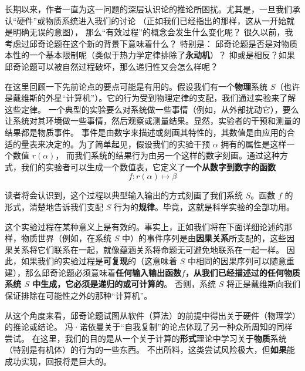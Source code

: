 \documentclass[a4paper,12pt]{article}
\begin{document}
长期以来，作者一直为这一问题的深层认识论的推论所困扰\cite{RosenR1962}。尤其是，一旦我们承认“\gls{硬件}”或\gls{物质系统}进入我们的讨论
（正如我们已经指出的那样，这从一开始就是明确无误的意图）， 那么“\gls{有效过程}”的概念会发生什么变化呢？
很久以前\cite{RosenR1962}，我考虑过\gls{邱奇论题}在这个新的背景下意味着什么？ 特别是：
邱奇论题是否是对\gls{物质}本性的一个基本限制呢（类似于热力学定律排除了\textbf{永动机}）？
抑或是相反？如果邱奇论题可以被自然过程破坏，那么递归性又会怎么样呢？

在这里回顾一下先前论点的要点可能是有用的。假设我们有一个\textbf{物理}系统 $S$（也许是戴维斯的外星“计算机”）。它的行为受到物理定律的支配，我们通过实验来了解这些定律。
一个典型的实验要么对系统做一些事情（例如，从外部扰动它），要么让系统对其环境做一些事情，然后\gls{观察}或\gls{测量}结果。显然，实验者的\gls{干预}和\gls{测量}的结果都是\gls{物质事件}。
\gls{事件}是由数字来描述或刻画其特性的，其数值是由应用的合适的量表来决定的\cite{RosenR1978}。为了简单起见，假设我们的实验干预 $\alpha$ 拥有的属性是这样一个数值 $r(\alpha)$，
而我们系统的结果行为由另一个这样的数字刻画。通过这种方式，我们的实验者可以生成一个数值表，它定义了\textbf{一个从数字到数字的函数}  \begin{equation}\label{eq:1} f: r(\alpha) \mapsto \beta\end{equation}

读者将会认识到，这个过程以典型输入输出的方式刻画了我们系统 $S$。函数 $f$ 的形式，清楚地告诉我们支配 $S$ 行为的\textbf{规律}。毕竟，这就是\gls{科学实验}的全部功用。

这个实验过程在某种意义上是有效的。事实上，正如我们将在下面详细论述的那样，\gls{物质世界}（例如，在系统 $S$ 中）的\gls{事件序列}是由\textbf{\gls{因果关系}}所支配的，这些因果关系将它们联系在一起，就像\gls{蕴涵关系}将\gls{命题}无可避免地联系在一起一样。
因此，如果我们的实验过程是\textbf{\gls{可复现}}的（这意味着 $S$ 中相同的\gls{因果序列}可以随意重建），那么\gls{邱奇论题}必须意味着\textbf{任何输入输出函数\hyperref[eq:1]{$f$}，从我们已经描述过的任何\gls{物质系统} $S$ 中\gls{生成}，它必须是递归的或\gls{可计算}的}。
否则，系统 $S$ 将正是戴维斯向我们保证排除在可能性之外的那种“计算机”。

从这个角度来看，\gls{邱奇论题}试图从\gls{软件}（\gls{算法}）的前提中得出关于\gls{硬件}（物理学）的推论或结论。
冯·诺依曼关于“自我复制”的论点\cite{BurksA1966}体现了另一种众所周知的同样尝试。
在这里，我们的目的是从一个关于计算的\textbf{\gls{形式}}理论中学习关于\textbf{\gls{物质}}系统（特别是有机体）的行为的一些东西。
不出所料，这类尝试风险极大，但\textbf{如果}能成功实现，回报将是巨大的。
\end{document}
